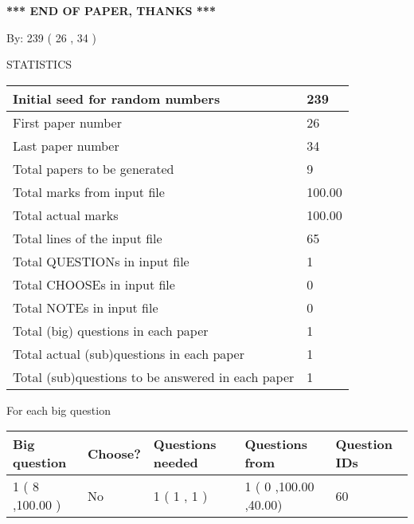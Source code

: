 \documentclass[12pt]{article}
\begin{document}
\vspace{1.0in} 
{\textbf{\large{ *** END OF PAPER, THANKS *** }}} 
   
   
\hspace{1.0in} By: 
         239 (          26 ,           34 )
   
   
   
\vspace{0.2in}
\vspace{0.2in}
   
   
 \newpage
\setcounter{page}{1} 
   
   
 {\LARGE{STATISTICS}}
   
\vspace{0.2in}
   
 \begin{tabular}{|l|l|}
 \hline
 Initial seed for random numbers &         239  \\
\hline
 First paper number &          26  \\
\hline
 Last  paper number &          34  \\
\hline
 Total papers to be generated &           9  \\
\hline
Total marks from input file & 100.00 \\
\hline
Total actual marks & 100.00 \\
\hline
 Total lines of the input file &          65  \\
 \hline
 Total QUESTIONs in input file &           1  \\
\hline
 Total CHOOSEs in input file &           0  \\
\hline
 Total NOTEs in input file &           0  \\
\hline
 Total (big) questions in each paper &           1  \\
\hline
 Total actual (sub)questions in each paper &           1  \\
\hline
 Total (sub)questions to be answered in each paper &           1  \\
\hline
 \end{tabular}
   
   
 \newpage
   
{\LARGE{For each big question}}
   
   
\vspace{0.2in}
   
   
\noindent\hspace{-0.4in}\begin{tabular}{|l|l|l|l|l|}
\hline
 Big question & Choose? & Questions needed & Questions from & Question IDs \\ 
\hline
           1 (           8 ,100.00
 ) &  No   & 
           1 (           1 ,            1 ) &            1 (           0
,100.00
 ,40.00) &           60  \\
 \hline
 \end{tabular}
 
 
\end{document}
